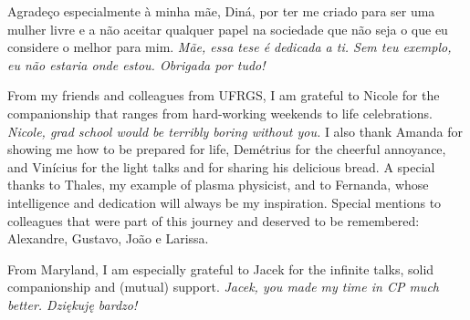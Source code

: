 Agradeço especialmente à minha mãe, Diná, por ter me criado para ser uma
mulher livre e a não aceitar qualquer papel na sociedade que não seja o
que eu considere o melhor para mim. \emph{Mãe, essa tese é dedicada a ti.
  Sem teu exemplo, eu não estaria onde estou. Obrigada por tudo!}

From my friends and colleagues from UFRGS, I am grateful to Nicole for the
companionship that ranges from hard-working weekends to life celebrations.
\emph{Nicole, grad school would be terribly boring without you.} I also thank
Amanda for showing me how to be prepared for life, Demétrius for the cheerful
annoyance, and Vinícius for the light talks and for sharing his delicious
bread. A special thanks to Thales, my example of plasma physicist, and to
Fernanda, whose intelligence and dedication will always be my inspiration. 
Special mentions to colleagues that were part of this journey and deserved
to be remembered: Alexandre, Gustavo, João e Larissa.

From Maryland, I am especially grateful to Jacek for the infinite talks, solid
companionship and (mutual) support.\emph{ Jacek, you made my time in CP much
  better. Dziękuję bardzo!}






  
  
  


